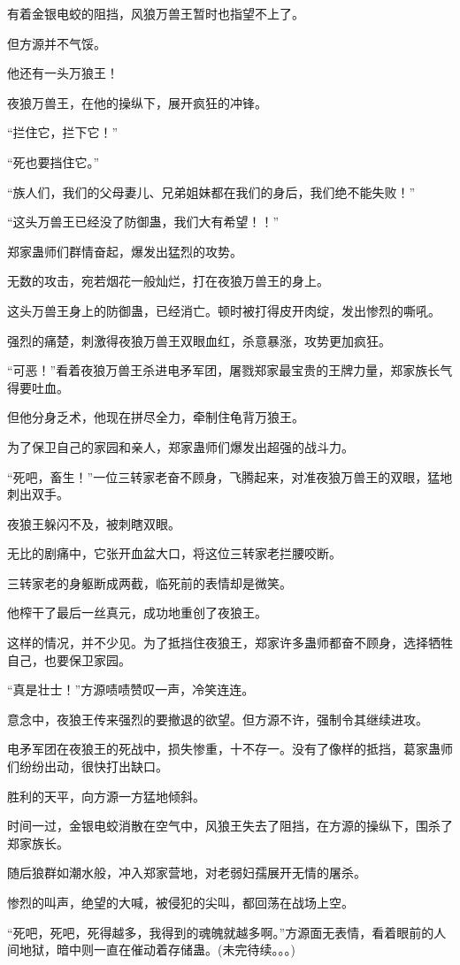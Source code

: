 \begin{this_body}
有着金银电蛟的阻挡，风狼万兽王暂时也指望不上了。

但方源并不气馁。

他还有一头万狼王！

夜狼万兽王，在他的操纵下，展开疯狂的冲锋。

“拦住它，拦下它！”

“死也要挡住它。”

“族人们，我们的父母妻儿、兄弟姐妹都在我们的身后，我们绝不能失败！”

“这头万兽王已经没了防御蛊，我们大有希望！！”

郑家蛊师们群情奋起，爆发出猛烈的攻势。

无数的攻击，宛若烟花一般灿烂，打在夜狼万兽王的身上。

这头万兽王身上的防御蛊，已经消亡。顿时被打得皮开肉绽，发出惨烈的嘶吼。

强烈的痛楚，刺激得夜狼万兽王双眼血红，杀意暴涨，攻势更加疯狂。

“可恶！”看着夜狼万兽王杀进电矛军团，屠戮郑家最宝贵的王牌力量，郑家族长气得要吐血。

但他分身乏术，他现在拼尽全力，牵制住龟背万狼王。

为了保卫自己的家园和亲人，郑家蛊师们爆发出超强的战斗力。

“死吧，畜生！”一位三转家老奋不顾身，飞腾起来，对准夜狼万兽王的双眼，猛地刺出双手。

夜狼王躲闪不及，被刺瞎双眼。

无比的剧痛中，它张开血盆大口，将这位三转家老拦腰咬断。

三转家老的身躯断成两截，临死前的表情却是微笑。

他榨干了最后一丝真元，成功地重创了夜狼王。

这样的情况，并不少见。为了抵挡住夜狼王，郑家许多蛊师都奋不顾身，选择牺牲自己，也要保卫家园。

“真是壮士！”方源啧啧赞叹一声，冷笑连连。

意念中，夜狼王传来强烈的要撤退的欲望。但方源不许，强制令其继续进攻。

电矛军团在夜狼王的死战中，损失惨重，十不存一。没有了像样的抵挡，葛家蛊师们纷纷出动，很快打出缺口。

胜利的天平，向方源一方猛地倾斜。

时间一过，金银电蛟消散在空气中，风狼王失去了阻挡，在方源的操纵下，围杀了郑家族长。

随后狼群如潮水般，冲入郑家营地，对老弱妇孺展开无情的屠杀。

惨烈的叫声，绝望的大喊，被侵犯的尖叫，都回荡在战场上空。

“死吧，死吧，死得越多，我得到的魂魄就越多啊。”方源面无表情，看着眼前的人间地狱，暗中则一直在催动着存储蛊。(未完待续。。。)

\end{this_body}

